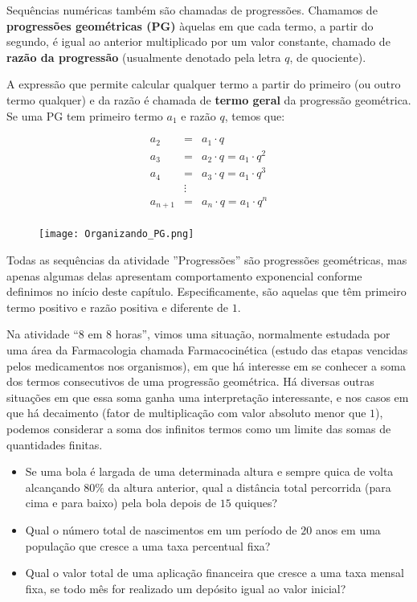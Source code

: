
Sequências numéricas também são chamadas de progressões. Chamamos de \textbf{progressões geométricas (PG)} àquelas em que cada termo, a partir do segundo, é igual ao anterior multiplicado por um valor constante, chamado de \textbf{razão da progressão} (usualmente denotado pela letra $q$, de quociente). 

A expressão que permite calcular qualquer termo a partir do primeiro (ou outro termo qualquer) e da razão é chamada de \textbf{termo geral} da progressão geométrica. Se uma PG tem primeiro termo $a_{1}$ e razão $q$, temos que:

\begin{eqnarray*}
a_2 &=& a_1 \cdot q\\
a_3 &=& a_2 \cdot q=a_1 \cdot q^2\\
a_4 &=& a_3 \cdot q=a_1 \cdot q^3\\
&\vdots& \\
a_{n+1} &=& a_n \cdot q=a_1 \cdot q^n\\
\end{eqnarray*}

\begin{figure}[H]
\centering
\texttt{[image: Organizando\_PG.png]}
\end{figure}

Todas as sequências da atividade ”Progressões” são progressões geométricas, mas apenas algumas delas apresentam comportamento exponencial conforme definimos no início deste capítulo. Especificamente, são aquelas que têm primeiro termo positivo e razão positiva e diferente de $1$.

Na atividade “8 em 8 horas”, vimos uma situação, normalmente estudada por uma área da Farmacologia chamada Farmacocinética (estudo das etapas vencidas pelos medicamentos nos organismos), em que há interesse em se conhecer a soma dos termos consecutivos de uma progressão geométrica. Há diversas outras situações em que essa soma ganha uma interpretação interessante, e nos casos em que há decaimento (fator de multiplicação com valor absoluto menor que $1$), podemos considerar a soma dos infinitos termos como um limite das somas de quantidades finitas.

\begin{itemize}

\item Se uma bola é largada de uma determinada altura e sempre quica de volta alcançando $80\%$ da altura anterior, qual a distância total percorrida (para cima e para baixo) pela bola depois de $15$ quiques?

\item Qual o número total de nascimentos em um período de $20$ anos em uma população que cresce a uma taxa percentual fixa?

\item Qual o valor total de uma aplicação financeira que cresce a uma taxa mensal fixa, se todo mês for realizado um depósito igual ao valor inicial?

\end{itemize}

